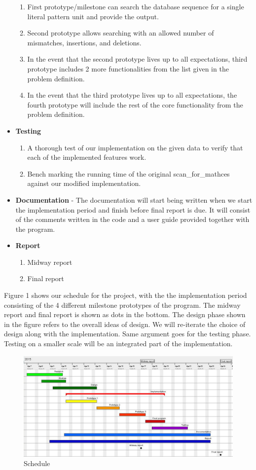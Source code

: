 \documentclass[12pt]{article}
\begin{document}
\begin{itemize}
\begin{enumerate}
\item First prototype/milestone can search the database sequence for a single literal pattern unit and provide the output.
\item Second prototype allows searching with an allowed number of mismatches, insertions, and deletions.
\item In the event that the second prototype lives up to all expectations, third prototype includes 2 more functionalities from the list given in the problem definition.
\item In the event that the third prototype lives up to all expectations, the fourth prototype will include the rest of the core functionality from the problem definition.
\end{enumerate}
\item \textbf{Testing}
\begin{enumerate}
\item A thorough test of our implementation on the given data to verify that each of the implemented features work.
\item Bench marking the running time of the original scan\_for\_mathces against our modified implementation.
\end{enumerate}
\item \textbf{Documentation} - The documentation will start being written when we start the implementation period
and finish before final report is due. It will consist of the comments written in the code and a user guide provided 
together with the program.
\item \textbf{Report}
\begin{enumerate}
\item Midway report
\item Final report
\end{enumerate}
\end{itemize}
Figure 1 shows our schedule for the project, with the the implementation period consisting of the 4 different milestone
prototypes of the program. The midway report and final report is shown as dots in the bottom.
The design phase shown in the figure refers to the overall ideas of design. We will re-iterate the choice of design
along with the implementation. Same argument goes for the testing phase. Testing on a smaller scale will be an
integrated part of the implementation.
 \newpage
\begin{figure}[h!]
\includegraphics[scale=0.7]{gantt.PNG}
\caption{Schedule}
\end{figure}
\end{document}
